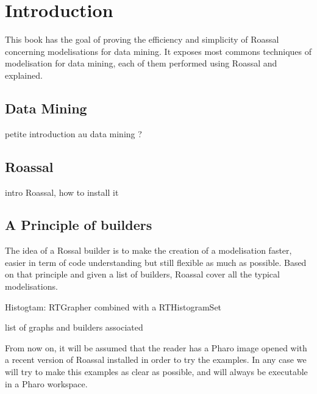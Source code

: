 \documentclass[a4paper,10pt,twoside]{book}
\begin{document}
\fi
\sloppy

\chapter{Introduction}
This book has the goal of proving the efficiency and simplicity of Roassal concerning modelisations for data mining. It exposes most commons techniques of modelisation for data mining, each of them performed using Roassal and explained. 
\section{Data Mining}
\begin{todo}

petite introduction au data mining ?
\end{todo}
\section{Roassal}
\begin{todo}

intro Roassal, how to install it
\end{todo}
\section{A Principle of builders}
The idea of a Rossal builder is to make the creation of a modelisation faster, easier in term of code understanding but still flexible as much as possible.
Based on that principle and given a list of builders, Roassal cover all the typical modelisations.

Histogtam: RTGrapher combined with a RTHistogramSet   

\begin{todo}

list of graphs and builders associated
\end{todo}

From now on, it will be assumed that the reader has a Pharo image opened with a recent version of Roassal installed in order to try the examples. In any case we will try to make this examples as clear as possible, and will always be executable in a Pharo workspace.   



\ifx\wholebook\relax\else
   
\end{document}
